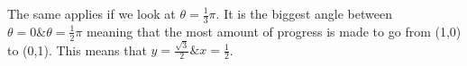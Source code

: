 \documentclass[preview]{standalone}
\begin{document}
\begin{center}
The same applies if we look at $\theta = \frac{1}{3} \pi$. It is the biggest angle between $\theta = 0 \& \theta = \frac{1}{2} \pi$ meaning that the most amount of progress is made to go from (1,0) to (0,1). This means that $y=\frac{\sqrt{3}}{2} \& x = \frac{1}{2}$.
\end{center}
\end{document}
